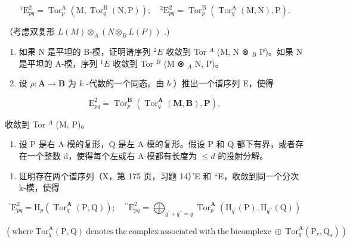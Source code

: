 \[
{ } ^ { 1 } \mathrm{E} _ { p q } ^ { 2 } = \operatorname{Tor} _ { p } ^ { \mathrm{A} } ( \mathrm{M} , \operatorname{Tor} _ { q } ^ { \mathrm{B} } ( \mathrm{N} , \mathrm{P} ) ) ; \quad { } ^ { 2 } \mathrm{E} _ { p q } ^ { 2 } = \operatorname{Tor} _ { p } ^ { \mathrm{B} } ( \operatorname{Tor} _ { q } ^ { \mathrm{A} } ( \mathrm{M} , \mathrm{N} ) , \mathrm{P} ) .
\]

（考虑双复形 \(L(M) \otimes_{A} (N \otimes_{B} L(P))\) .)

\begin{enumerate}
\def\labelenumi{\alph{enumi})}
\setcounter{enumi}{1}
\item
  如果 N 是平坦的 B-模，证明谱序列 \({}^{2}E\) 收敛到 Tor \(^{A}\) (M, N ⊗ \(_{B}\) P)。如果 N 是平坦的 A-模，序列 \({}^{1}E\) 收敛到 Tor \(^{B}\) (M ⊗ \(_{A}\) N, P)。
\item
  设 \(\rho: \mathbf{A} \to \mathbf{B}\) 为 \(k\) -代数的一个同态。由 \(b\) ）推出一个谱序列 E，使得
\end{enumerate}

\[
\mathrm{E} _ {p q} ^ {2} = \operatorname{Tor} _ {p} ^ {\mathbf {B}} \left(\operatorname{Tor} _ {q} ^ {\mathbf {A}} (\mathbf {M}, \mathbf {B}), \mathbf {P}\right),
\]

收敛到 Tor \(^{A}\) (M, P)。

\begin{enumerate}
\def\labelenumi{\arabic{enumi})}
\setcounter{enumi}{8}
\tightlist
\item
  设 P 是右 A-模的复形，Q 是左 A-模的复形。假设 P 和 Q 都下有界，或者存在一个整数 d，使得每个左或右 A-模都有长度为 \(\leqslant d\) 的投射分解。
\end{enumerate}

\begin{enumerate}
\def\labelenumi{\alph{enumi})}
\tightlist
\item
  证明存在两个谱序列（X，第 175 页，习题 14）'E 和 ``E，收敛到同一个分次 k-模，使得
\end{enumerate}

\[
^ {\prime} \mathrm{E} _ {p q} ^ {2} = \mathrm{H} _ {p} (\operatorname{Tor} _ {q} ^ {\mathbf {A}} (\mathrm{P}, \mathrm{Q})); \quad^ {\prime \prime} \mathrm{E} _ {p q} ^ {2} = \bigoplus_ {q ^ {\prime} + q ^ {\prime \prime} = q} \operatorname{Tor} _ {p} ^ {\mathbf {A}} \left(\mathrm{H} _ {q ^ {\prime}} (\mathrm{P}), \mathrm{H} _ {q ^ {\prime \prime}} (\mathrm{Q})\right)
\]

\((\mathrm{where}\ \mathrm{Tor}_{q}^{\mathrm{A}}(\mathrm{P},\mathrm{Q})\ \mathrm{denotes}\ \mathrm{the}\ \mathrm{complex}\ \mathrm{associated}\ \mathrm{with}\ \mathrm{the}\ \mathrm{bicomplexe}\ \oplus\ \mathrm{Tor}_{q}^{\mathrm{A}}(\mathrm{P}_{r},\mathrm{Q}_{s}))\)

